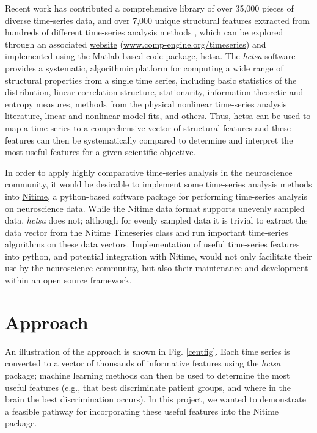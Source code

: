\documentclass[twocolumn]{bmcart}%
\begin{document}
Recent work has contributed a comprehensive library of over 35,000
pieces of diverse time-series data, and over 7,000 unique structural
features extracted from hundreds of different time-series analysis
methods \cite{Fulcher2013}, which can be explored through an associated
\href{www.comp-engine.org/timeseries}{website}
(\url{www.comp-engine.org/timeseries}) and implemented using the
Matlab-based code package,
\href{https://github.com/benfulcher/hctsa}{hctsa}. The \emph{hctsa}
software provides a systematic, algorithmic platform for computing a
wide range of structural properties from a single time series, including
basic statistics of the distribution, linear correlation structure,
stationarity, information theoretic and entropy measures, methods from
the physical nonlinear time-series analysis literature, linear and
nonlinear model fits, and others. Thus, hctsa can be used to map a time
series to a comprehensive vector of structural features and these
features can then be systematically compared to determine and interpret
the most useful features for a given scientific objective.

In order to apply highly comparative time-series analysis in the
neuroscience community, it would be desirable to implement some
time-series analysis methods into
\href{http://nipy.org/nitime/}{Nitime}, a python-based software package
for performing time-series analysis on neuroscience data. While the
Nitime data format supports unevenly sampled data, \emph{hctsa} does
not; although for evenly sampled data it is trivial to extract the data
vector from the Nitime Timeseries class and run important time-series
algorithms on these data vectors. Implementation of useful time-series
features into python, and potential integration with Nitime, would not
only facilitate their use by the neuroscience community, but also their
maintenance and development within an open source framework.

\section{Approach}\label{approach}

An illustration of the approach is shown in Fig. \ref{centfig}. Each
time series is converted to a vector of thousands of informative
features using the \emph{hctsa} package; machine learning methods can
then be used to determine the most useful features (e.g., that best
discriminate patient groups, and where in the brain the best
discrimination occurs). In this project, we wanted to demonstrate a
feasible pathway for incorporating these useful features into the Nitime
package.
\end{document}
